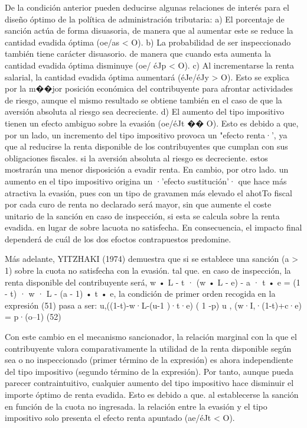 \documentclass[10pt,a4paper]{article}
\begin{document}
De la condición anterior pueden deducirse algunas relaciones de interés para el diseño óptimo de la política de administración tributaria: a) El porcentaje de sanción actúa de forma disuasoria, de manera que al aumentar este se reduce la cantidad evadida óptima (oe/as < O). b) La probabilidad de ser inspeccionado también tiene carácter disuasorio. de manera que cuando esta aumenta la cantidad evadida óptima disminuye (oe/ éJp < O). c) Al incrementarse la renta salarial, la cantidad evadida óptima aumentará (éJe/éJy > O).
Esto se explica por la m��jor posición económica del contribuyente para afrontar actividades de riesgo, aunque el mismo resultado se obtiene también en el caso de que la aversión absoluta al riesgo sea decreciente.
d) El aumento del tipo impositivo tienen un efecto ambiguo sobre la evasión (oe/éJt �� O). 
Esto es debido a que, por un lado, un incremento del tipo impositivo provoca un "efecto renta·', ya que al reducirse la renta disponible de los contribuyentes que cumplan con sus obligaciones fiscales. si la aversión absoluta al riesgo es decreciente. estos mostrarán una menor disposición a evadir renta. En cambio, por otro lado. un aumento en el tipo impositivo origina un ·'efecto sustitución'· que hace más atractiva la evasión, pues con un tipo de gravamen más elevado el ahotTo fiscal por cada curo de renta no declarado será mayor, sin que aumente el coste unitario de la sanción en caso de inspección, si esta se calcula sobre la renta evadida. en lugar de sobre lacuota no satisfecha. En consecuencia, el impacto final dependerá de cuál de los dos efoctos  contrapuestos predomine.

Más adelante, YITZHAKI (1974) demuestra que si se establece una sanción (a > 1) sobre la cuota no satisfecha con la evasión. tal que. en caso de inspección, la renta disponible del contribuyente será, w • L - t · (w • L - e) - a · t • e = (1 - t) · w · L - (a - 1) • t • e, la condición de primer orden recogida en la expresión (51) pasa a ser:
u,((1-t)-w·L-(u-1 )·t·e) ( 1 -p)
u , (w·I,·(1-t)+c·e) = p·(o--1) (52)

Con este cambio en el mecanismo sancionador, la relación marginal con la que el contribuyente valora comparativamente la utilidad de la renta disponible según sea o no inspeccionado (primer término de la expresión) es ahora independiente del tipo impositivo (segundo término de la expresión). Por tanto, aunque pueda parecer contraintuitivo, cualquier aumento del tipo impositivo hace disminuir el importe óptimo de renta evadida. Esto es debido a que. al establecerse la sanción en función de la cuota no ingresada. la relación entre la evasión y el tipo impositivo solo presenta el efecto renta apuntado (ae/éJt < O).
\end{document}
